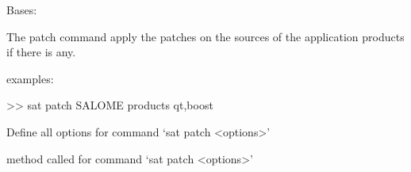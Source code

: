 \documentclass[a4paper,10pt,english]{sphinxmanual}
\begin{document}
\begin{fulllineitems}
\label{\detokenize{apidoc_commands/commands:commands.patch.Command}}
Bases: 

The patch command apply the patches on the sources of the application products
if there is any.

\begin{DUlineblock}{0em}
\item[] examples:
\item[] \textgreater{}\textgreater{} sat patch SALOME \textendash{}products qt,boost
\end{DUlineblock}

\begin{fulllineitems}
\label{\detokenize{apidoc_commands/commands:commands.patch.Command.getParser}}
Define all options for command ‘sat patch \textless{}options\textgreater{}’

\end{fulllineitems}


\begin{fulllineitems}
\label{\detokenize{apidoc_commands/commands:commands.patch.Command.name}}
\end{fulllineitems}


\begin{fulllineitems}
\label{\detokenize{apidoc_commands/commands:commands.patch.Command.run}}
method called for command ‘sat patch \textless{}options\textgreater{}’

\end{fulllineitems}


\end{fulllineitems}

\end{document}
